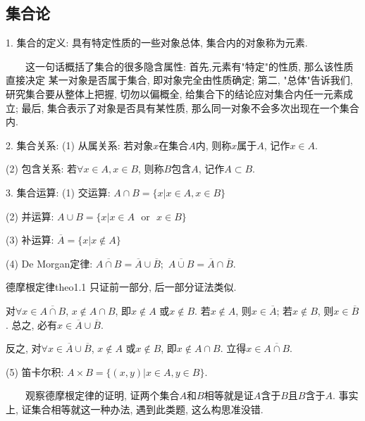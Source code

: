 \subsection{集合论}

1. 集合的定义: 具有特定性质的一些对象总体, 集合内的对象称为元素.

\begin{tcolorbox}[colback=blue!5,colframe=blue!75!black,title=定义解析]
    ~~~~这一句话概括了集合的很多隐含属性: 首先,元素有"特定"的性质, 那么该性质直接决定
    某一对象是否属于集合, 即对象完全由性质确定; 第二, "总体"告诉我们, 研究集合要从整体上把握, 切勿以偏概全, 给集合下的结论应对集合内任一元素成立; 
    最后, 集合表示了对象是否具有某性质, 那么同一对象不会多次出现在一个集合内.
\end{tcolorbox}

2. 集合关系: (1) 从属关系: 若对象$x$在集合$A$内, 则称$x$属于$A$, 记作$x \in A$.

(2) 包含关系: 若$\forall x \in A, x \in B$, 则称$B$包含$A$, 记作$A \subset B$. 

3. 集合运算: (1) 交运算: $A \cap B=\{x|x\in A, x\in B\}$

(2) 并运算: $A \cup B=\{x|x\in A \text{~~or~~} x\in B\}$

(3) 补运算: $\overline{A}=\{x|x \notin A \}$

(4) De Morgan定律: $\overline{A \cap B}=\overline{A}\cup \overline{B};$ $\overline{A \cup B}=\overline{A}\cap \overline{B}.$

\begin{theo}{德摩根定律}{theo1.1}
只证前一部分, 后一部分证法类似.

对$\forall x \in \overline{A \cap B}$, $x \notin A \cap B$, 即$x \notin A$ 或$x \notin B$. 若$x \notin A$, 则$x \in \overline{A}$; 若$x \notin B$, 则$x \in \overline{B}$.
总之, 必有$x \in \overline{A}\cup \overline{B}.$

反之, 对$\forall x \in \overline{A}\cup \overline{B}$, $x \notin A$ 或$x \notin B$, 即$x \notin A\cap B$. 立得$x \in \overline{A \cap B}.$

\end{theo}

(5) 笛卡尔积: $A \times B=\{(x,y)|x \in A, y \in B\}$.

\begin{tcolorbox}[colback=yellow!10,colframe=red!75!black,title=小窍门]
    ~~~~观察德摩根定律的证明, 证两个集合$A$和$B$相等就是证$A$含于$B$且$B$含于$A$. 
    事实上, 证集合相等就这一种办法, 遇到此类题, 这么构思准没错.
  \end{tcolorbox}

